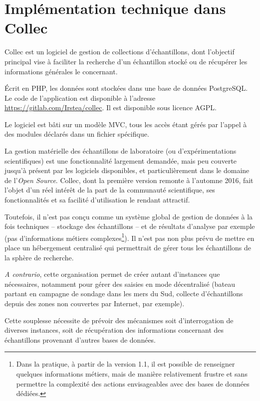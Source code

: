 \chapter{Implémentation technique dans Collec}

Collec est un logiciel de gestion de collections d'échantillons, dont l'objectif principal vise à faciliter la recherche d'un échantillon stocké ou de récupérer les informations générales le concernant.

Écrit en PHP, les données sont stockées dans une base de données PostgreSQL. Le code de l'application est disponible à l'adresse \url{https://gitlab.com/Irstea/collec}. Il est disponible sous licence AGPL.

Le logiciel est bâti sur un modèle MVC, tous les accès étant gérés par l'appel à des modules déclarés dans un fichier spécifique. 

La gestion matérielle des échantillons de laboratoire (ou d'expérimentations scientifiques) est une fonctionnalité largement demandée, mais peu couverte jusqu'à présent par les logiciels disponibles, et particulièrement dans le domaine de l'\textit{Open Source}. Collec, dont la première version remonte à l'automne 2016, fait l'objet d'un réel intérêt de la part de la communauté scientifique, ses fonctionnalités et sa facilité d'utilisation le rendant attractif.

Toutefois, il n'est pas conçu comme un système global de gestion de données à la fois techniques -- stockage des échantillons -- et de résultats d'analyse par exemple (pas d'informations métiers complexes\footnote{Dans la pratique, à partir de la version 1.1, il est possible de renseigner quelques informations métiers, mais de manière relativement frustre et sans permettre la complexité des actions envisageables avec des bases de données dédiées.}).
Il n'est pas non plus prévu de mettre en place un hébergement centralisé qui permettrait de gérer tous les échantillons de la sphère de recherche.

\textit{A contrario}, cette organisation permet de créer autant d'instances que néces\-saires, notamment pour gérer des saisies en mode décentralisé (bateau partant en campagne de sondage dans les mers du Sud, collecte d'échantillons depuis des zones non couvertes par Internet, par exemple).

Cette souplesse nécessite de prévoir des mécanismes soit d'interrogation de diverses instances, soit de récupération des informations concernant des échantillons provenant d'autres bases de données. 

